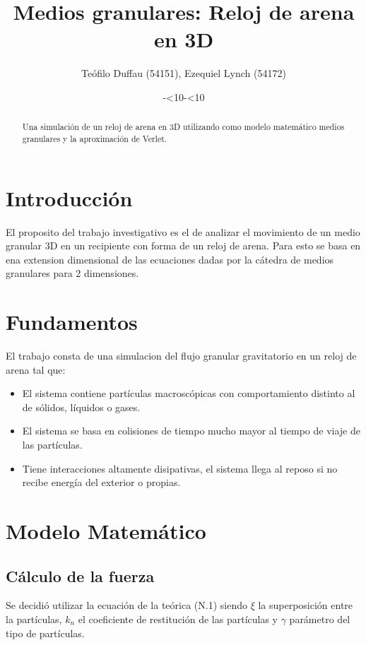 \documentclass{article}
\title{Medios granulares: Reloj de arena en 3D}
\author{Teófilo Duffau (54151), Ezequiel Lynch  (54172)}
\date{\the\year-\ifnum\month<10\relax0\fi\the\month-\ifnum\day<10\relax0\fi\the\day}
\begin{document}
\maketitle

\begin{abstract}
Una simulación de un reloj de arena en 3D utilizando como modelo matemático medios granulares y la aproximación de Verlet.
\end{abstract}
\newpage
\tableofcontents

\newpage
\section{Introducción}
El proposito del trabajo investigativo es el de analizar el movimiento de un medio granular 3D en un recipiente con forma de un reloj de arena. Para esto se basa en ena extension dimensional de las ecuaciones dadas por la cátedra de medios granulares para 2 dimensiones.

\section{Fundamentos}
El trabajo consta de una simulacion del flujo granular gravitatorio en un reloj de arena tal que:
\begin{itemize}
  \item El sistema contiene partículas macroscópicas con comportamiento distinto al de sólidos, líquidos o gases.
  \item El sistema se basa en colisiones de tiempo mucho mayor al tiempo de viaje de las partículas.
  \item Tiene interacciones altamente disipativas, el sistema llega al reposo si no recibe energía del exterior o propias. 
\end{itemize}


\section{Modelo Matemático}

\subsection{Cálculo de la fuerza}
Se decidió utilizar la ecuación de la teórica (N.1) siendo \begin{math} \xi \end{math} la superposición entre la partículas, \begin{math}k_n\end{math} el coeficiente de restitución de las partículas y \begin{math}\gamma\end{math} parámetro del tipo de partículas.
\end{document}
